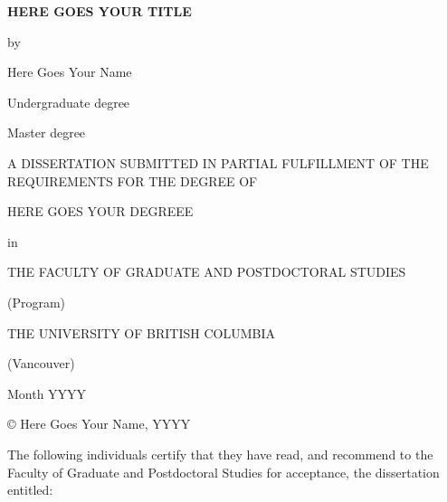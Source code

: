\documentclass[]{article}
\author{}
\date{\vspace{-2.5em}}
\numberwithin{equation}{section}
\begin{document}
\thispagestyle{empty}
\begin{singlespace} 
\begin{center}

\Huge

\textbf{HERE GOES YOUR TITLE}

\Large

\vspace{8mm}

by

\vspace{8mm}

\huge

Here Goes Your Name

\Large

\vspace{8mm}

Undergraduate degree

Master degree

\vspace{10mm}

A DISSERTATION SUBMITTED IN PARTIAL FULFILLMENT OF THE REQUIREMENTS FOR THE DEGREE OF

\vspace{5mm}

HERE GOES YOUR DEGREEE

\vspace{5mm}
in

\vspace{5mm}

THE FACULTY OF GRADUATE AND POSTDOCTORAL STUDIES

\vspace{5mm}

(Program)

\vspace{5mm}

THE UNIVERSITY OF BRITISH COLUMBIA

\vspace{5mm}

(Vancouver)

\vspace{6mm}

Month YYYY

© Here Goes Your Name, YYYY

\end{center}
\end{singlespace}
\normalsize
\clearpage

\setcounter{page}{2}

\doublespacing

The following individuals certify that they have read, and recommend to the Faculty of Graduate
and Postdoctoral Studies for acceptance, the dissertation entitled:
\end{document}

